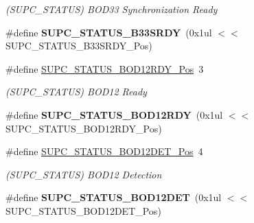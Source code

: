 \begin{DoxyCompactItemize}
\begin{DoxyCompactList}\small\item\em (S\+U\+P\+C\+\_\+\+S\+T\+A\+T\+U\+S) B\+O\+D33 Synchronization Ready \end{DoxyCompactList}\item 
\hypertarget{group___s_a_m_l21___s_u_p_c_gacdb92ad3d9283b941b94829bf088c039}{}\#define {\bfseries S\+U\+P\+C\+\_\+\+S\+T\+A\+T\+U\+S\+\_\+\+B33\+S\+R\+D\+Y}~(0x1ul $<$$<$ S\+U\+P\+C\+\_\+\+S\+T\+A\+T\+U\+S\+\_\+\+B33\+S\+R\+D\+Y\+\_\+\+Pos)\label{group___s_a_m_l21___s_u_p_c_gacdb92ad3d9283b941b94829bf088c039}

\item 
\hypertarget{group___s_a_m_l21___s_u_p_c_ga43a7d8e5fb0cf300f41160b612f02387}{}\#define \hyperlink{group___s_a_m_l21___s_u_p_c_ga43a7d8e5fb0cf300f41160b612f02387}{S\+U\+P\+C\+\_\+\+S\+T\+A\+T\+U\+S\+\_\+\+B\+O\+D12\+R\+D\+Y\+\_\+\+Pos}~3\label{group___s_a_m_l21___s_u_p_c_ga43a7d8e5fb0cf300f41160b612f02387}

\begin{DoxyCompactList}\small\item\em (S\+U\+P\+C\+\_\+\+S\+T\+A\+T\+U\+S) B\+O\+D12 Ready \end{DoxyCompactList}\item 
\hypertarget{group___s_a_m_l21___s_u_p_c_ga1d07a5500c5c62f9597d7cecea780e7d}{}\#define {\bfseries S\+U\+P\+C\+\_\+\+S\+T\+A\+T\+U\+S\+\_\+\+B\+O\+D12\+R\+D\+Y}~(0x1ul $<$$<$ S\+U\+P\+C\+\_\+\+S\+T\+A\+T\+U\+S\+\_\+\+B\+O\+D12\+R\+D\+Y\+\_\+\+Pos)\label{group___s_a_m_l21___s_u_p_c_ga1d07a5500c5c62f9597d7cecea780e7d}

\item 
\hypertarget{group___s_a_m_l21___s_u_p_c_gaf2bf651e08025ca7246aea7e76e76a80}{}\#define \hyperlink{group___s_a_m_l21___s_u_p_c_gaf2bf651e08025ca7246aea7e76e76a80}{S\+U\+P\+C\+\_\+\+S\+T\+A\+T\+U\+S\+\_\+\+B\+O\+D12\+D\+E\+T\+\_\+\+Pos}~4\label{group___s_a_m_l21___s_u_p_c_gaf2bf651e08025ca7246aea7e76e76a80}

\begin{DoxyCompactList}\small\item\em (S\+U\+P\+C\+\_\+\+S\+T\+A\+T\+U\+S) B\+O\+D12 Detection \end{DoxyCompactList}\item 
\hypertarget{group___s_a_m_l21___s_u_p_c_ga89a4526fde8ced4cc93a047e176b6e21}{}\#define {\bfseries S\+U\+P\+C\+\_\+\+S\+T\+A\+T\+U\+S\+\_\+\+B\+O\+D12\+D\+E\+T}~(0x1ul $<$$<$ S\+U\+P\+C\+\_\+\+S\+T\+A\+T\+U\+S\+\_\+\+B\+O\+D12\+D\+E\+T\+\_\+\+Pos)\label{group___s_a_m_l21___s_u_p_c_ga89a4526fde8ced4cc93a047e176b6e21}


\end{DoxyCompactItemize}
